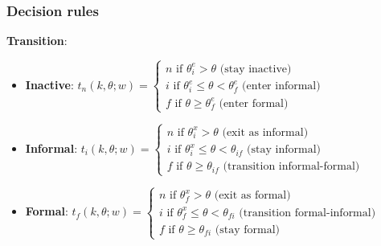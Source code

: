 \documentclass[aspectratio=169]{beamer}
\begin{document}
\begin{frame}
\frametitle{Decision rules} \label{decision_rules}


\textbf{Transition}: 
\begin{itemize}
    \item \textbf{Inactive}: $t_n(k,\theta;w) = \begin{cases}
        n \text{ if } \theta_i^e  > \theta \text{ (stay inactive)} \\
        i \text{ if } \theta_i^e \leq \theta < \theta_f^e \text{ (enter informal)} \\
        f \text{ if } \theta  \geq \theta_f^e \text{ (enter formal)}
    \end{cases}$
    \item \textbf{Informal}: $t_i(k,\theta;w) = \begin{cases}
        n \text{ if } \theta_i^x  > \theta \text{ (exit as informal)} \\
        i \text{ if } \theta_i^x \leq \theta < \theta_{if} \text{ (stay informal)} \\
        f \text{ if } \theta  \geq \theta_{if} \text{ (transition informal-formal)}
    \end{cases}$
    \item \textbf{Formal}: $t_f(k,\theta;w) = \begin{cases}
        n \text{ if } \theta_f^x  > \theta \text{ (exit as formal)} \\
        i \text{ if } \theta_f^x \leq \theta < \theta_{fi} \text{ (transition formal-informal)} \\
        f \text{ if } \theta  \geq \theta_{fi} \text{ (stay formal)}
    \end{cases}$
\end{itemize}

\end{frame}

\end{document}
